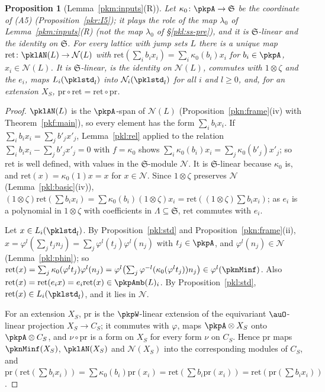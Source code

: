 \documentclass[10pt]{amsart}
\newtheorem{proposition}[theorem]{Proposition}
\theoremstyle{definition}
\theoremstyle{remark}
\begin{document}
\begin{proposition}[Lemma~\ref{pkm:inputs}(R)]\label{pkl:R}
Let $\kappa_0\colon\pkpA\to\mathfrak S$ be the coordinate of (A5) (Proposition~\ref{pkr:I5}); it plays the role of the
map $\lambda_0$ of Lemma~\ref{pkm:inputs}(R) (not the map $\lambda_0$ of \S\ref{pkl:ss-pre}), and it is
$\mathfrak S$-linear and the identity on $\mathfrak S$. For every lattice with jump sets $L$ there is a unique map
$\mathrm{ret}\colon\pklAN(L)\to\mathcal N(L)$ with $\mathrm{ret}(\sum_ib_ix_i)=\sum_i\kappa_0(b_i)x_i$ for $b_i\in\pkpA$,
$x_i\in\mathcal N(L)$. It is $\mathfrak S$-linear, is the identity on $\mathcal N(L)$, commutes with $1\otimes\zeta$ and
the $e_i$, maps $L_i(\pklstd_l)$ into $\mathcal N_i(\pklstd_l)$ for all $i$ and $l\ge0$, and, for an extension $X_S$,
$\mathrm{pr}\circ\mathrm{ret}=\mathrm{ret}\circ\mathrm{pr}$.
\end{proposition}

\begin{proof}
$\pklAN(L)$ is the $\pkpA$-span of $\mathcal N(L)$ (Proposition~\ref{pkn:frame}(iv) with Theorem~\ref{pkf:main}), so
every element has the form $\sum_ib_ix_i$. If $\sum_ib_ix_i=\sum_jb'_jx'_j$, Lemma~\ref{pkl:rel} applied to the
relation $\sum_ib_ix_i-\sum_jb'_jx'_j=0$ with $f=\kappa_0$ shows $\sum_i\kappa_0(b_i)x_i=\sum_j\kappa_0(b'_j)x'_j$; so
$\mathrm{ret}$ is well defined, with values in the $\mathfrak S$-module $\mathcal N$. It is $\mathfrak S$-linear because
$\kappa_0$ is, and $\mathrm{ret}(x)=\kappa_0(1)x=x$ for $x\in\mathcal N$. Since $1\otimes\zeta$ preserves $\mathcal N$
(Lemma~\ref{pkl:basic}(iv)), $(1\otimes\zeta)\mathrm{ret}(\sum b_ix_i)=\sum\kappa_0(b_i)(1\otimes\zeta)x_i=
\mathrm{ret}((1\otimes\zeta)\sum b_ix_i)$; as $e_i$ is a polynomial in $1\otimes\zeta$ with coefficients in
$\Lambda\subseteq\mathfrak S$, $\mathrm{ret}$ commutes with $e_i$.

Let $x\in L_i(\pklstd_l)$. By Proposition~\ref{pkl:std} and Proposition~\ref{pkn:frame}(ii), $x=\varphi^l(\sum_jt_jn_j)
=\sum_j\varphi^l(t_j)\varphi^l(n_j)$ with $t_j\in\pkpA$, and $\varphi^l(n_j)\in\mathcal N$ (Lemma~\ref{pkl:phin}); so
$\mathrm{ret}(x)=\sum_j\kappa_0(\varphi^lt_j)\varphi^l(n_j)=\varphi^l\bigl(\sum_j\varphi^{-l}(\kappa_0(\varphi^lt_j))n_j
\bigr)\in\varphi^l(\pknMinf)$. Also $\mathrm{ret}(x)=\mathrm{ret}(e_ix)=e_i\mathrm{ret}(x)\in\pkpAmb(L)_i$. By
Proposition~\ref{pkl:std}, $\mathrm{ret}(x)\in L_i(\pklstd_l)$, and it lies in $\mathcal N$.

For an extension $X_S$, $\mathrm{pr}$ is the $\pkpW$-linear extension of the equivariant $\auO$-linear projection
$X_S\to C_S$; it commutes with $\varphi$, maps $\pkpA\otimes X_S$ onto $\pkpA\otimes C_S$, and $\nu\circ\mathrm{pr}$ is a
form on $X_S$ for every form $\nu$ on $C_S$. Hence $\mathrm{pr}$ maps $\pknMinf(X_S)$, $\pklAN(X_S)$ and $\mathcal N(X_S)$
into the corresponding modules of $C_S$, and $\mathrm{pr}(\mathrm{ret}(\sum b_ix_i))=\sum\kappa_0(b_i)\mathrm{pr}(x_i)=
\mathrm{ret}(\sum b_i\mathrm{pr}(x_i))=\mathrm{ret}(\mathrm{pr}(\sum b_ix_i))$.
\end{proof}
\end{document}
